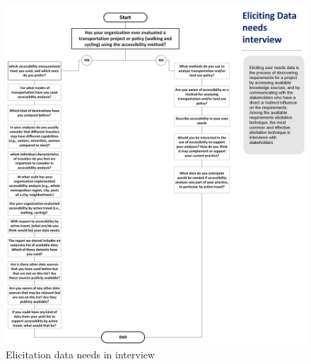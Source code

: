 \documentclass[
11pt, %
oneside, %
english, %
singlespacing, %
]{macthesis} %
\begin{document}
\begin{figure}

{\centering \includegraphics[width=1\linewidth]{figure/ch02-Fig-04} 

}

\caption{Elicitation data needs in interview}\label{fig:ch02-plot-fig-04}
\end{figure}
\end{document}
